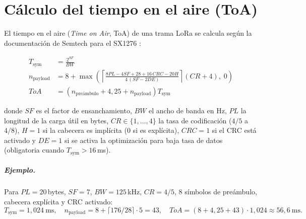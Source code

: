 \chapter{Cálculo del tiempo en el aire (ToA)}
\label{anexo:toa}

El tiempo en el aire (\textit{Time on Air}, ToA) de una trama LoRa se calcula según la documentación de Semtech para el SX1276 \cite{semtech_sx1276}:

\begin{align}
  T_{\text{sym}} &= \frac{2^{SF}}{BW} \label{eq:tsym}\\[4pt]
  n_{\text{payload}} &= 8 + \max\!\left( \left\lceil \frac{8PL - 4SF + 28 + 16\,CRC - 20H}{4\,(SF - 2DE)} \right\rceil (CR + 4),\; 0 \right) \label{eq:npayload}\\[4pt]
  ToA &= \left(n_{\text{preámbulo}} + 4{,}25 + n_{\text{payload}}\right) T_{\text{sym}} \label{eq:toa}
\end{align}

donde $SF$ es el factor de ensanchamiento, $BW$ el ancho de banda en Hz, $PL$ la longitud de la carga útil en bytes, $CR \in \{1,\dots,4\}$ la tasa de codificación ($4/5$ a $4/8$), $H=1$ si la cabecera es implícita ($0$ si es explícita), $CRC=1$ si el CRC está activado y $DE=1$ si se activa la optimización para baja tasa de datos (obligatoria cuando $T_{\text{sym}} > 16$\,ms).

\paragraph{Ejemplo.} Para $PL=20$\,bytes, $SF=7$, $BW=125$\,kHz, $CR=4/5$, 8 símbolos de preámbulo, cabecera explícita y CRC activado:
\[
  T_{\text{sym}} = 1{,}024\ \text{ms}, \quad
  n_{\text{payload}} = 8 + \lceil 176/28 \rceil \cdot 5 = 43, \quad
  ToA = (8 + 4{,}25 + 43)\cdot 1{,}024 \approx 56{,}6\ \text{ms}.
\]

